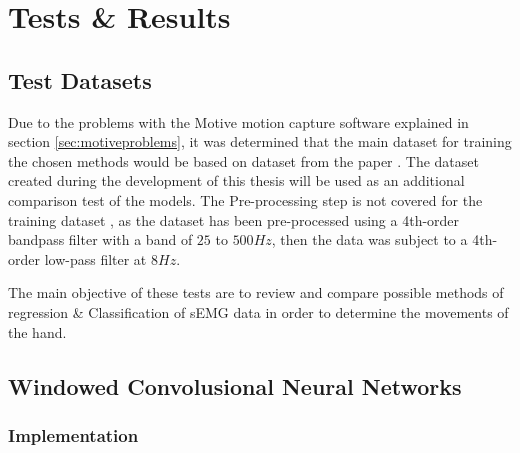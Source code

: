 \documentclass[../main.tex]{subfiles}
\begin{document}



\section{Tests \& Results}

\subsection{Test Datasets}

Due to the problems with the Motive motion capture software explained in section \ref{sec:motiveproblems}, it was determined that the main dataset for training the chosen methods would be based on dataset \cite{kinmusdataset} from the paper \cite{jarque2019}.
The dataset created during the development of this thesis will be used as an additional comparison test of the models. 
The Pre-processing step is not covered for the training dataset \cite{kinmusdataset}, as the dataset has been pre-processed using a 4th-order bandpass filter with a band of  $25$ to $500Hz$, then the data was subject to a 4th-order low-pass filter at $8 Hz$.

The main objective of these tests are to review and compare possible methods of regression \& Classification of sEMG data in order to determine the movements of the hand.


\subsection{Windowed Convolusional Neural Networks}

\subsubsection{Implementation}
\end{document}
